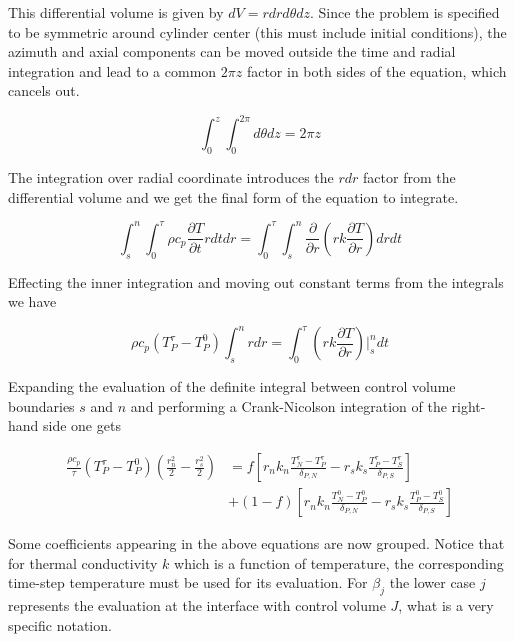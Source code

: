 \documentclass[oneside]{textbook}
\begin{document}
This differential volume is given by $dV=rdr{}d\theta{}dz$. Since the problem is specified to be symmetric around cylinder center (this must include initial conditions), the azimuth and axial components can be moved outside the time and radial integration and lead to a common $2\pi{}z$ factor in both sides of the equation, which cancels out.

\begin{equation}
\int_{0}^{z}\int_{0}^{2\pi}d\theta{}dz=2\pi{}z
\end{equation}

The integration over radial coordinate introduces the $rdr$ factor from the differential volume and we get the final form of the equation to integrate.

\begin{equation}
\int_{s}^{n}\int_{0}^{\tau}
\rho{}c_{p}\frac{\partial{}T}{\partial{}t}rdtdr=
\int_{0}^{\tau}\int_{s}^{n}
\frac{\partial}{\partial{}r}
\left(rk\frac{\partial{}T}{\partial{}r}\right)drdt
\end{equation}

Effecting the inner integration and moving out constant terms from the integrals we have

\begin{equation}
\rho{}c_{p}\left(T_P^{\tau}-T_P^{0}\right)\int_{s}^{n}rdr=
\int_{0}^{\tau}
\left(rk\frac{\partial{}T}{\partial{}r}\right)\bigg\vert_{s}^{n}dt
\end{equation}

Expanding the evaluation of the definite integral between control volume boundaries $s$ and $n$ and performing a Crank-Nicolson integration of the right-hand side one gets

\begin{equation}
\begin{aligned}
	\frac{\rho{}c_{p}}{\tau}
	\left(T_P^{\tau}-T_P^{0}\right)
	\left(\frac{r_n^2}{2}-\frac{r_s^2}{2}\right)
	&=f\left[
	r_nk_n\frac{T_N^{\tau}-T_P^{\tau}}{\delta_{P,N}}-
	r_sk_s\frac{T_P^{\tau}-T_S^{\tau}}{\delta_{P,S}}
	\right]\\[8pt]
	&+(1-f)\left[
	r_nk_n\frac{T_N^{0}-T_P^{0}}{\delta_{P,N}}-
	r_sk_s\frac{T_P^{0}-T_S^{0}}{\delta_{P,S}}
	\right]
\end{aligned}
\end{equation}

Some coefficients appearing in the above equations are now grouped. Notice that for thermal conductivity $k$ which is a function of temperature, the corresponding time-step temperature must be used for its evaluation. For $\beta_{j}$ the lower case $j$ represents the evaluation at the interface with control volume $J$, what is a very specific notation.
\end{document}
